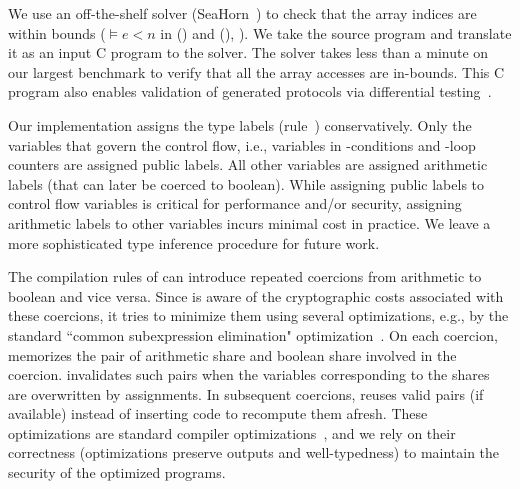 We use an off-the-shelf solver
(SeaHorn~\cite{seahorn}) to check that the array indices
are within bounds ($\models e < n$
in ({}) and ({}),
). We take the \tool source program and
translate it as an input C program to the solver. The solver takes less
than a minute on our largest benchmark to verify that all the array
accesses are in-bounds. This C program also enables
validation of \tool generated protocols via differential testing~\cite{mckeeman,frigate}.

Our implementation assigns the type labels (rule~{})
conservatively. Only the variables that govern the control flow, i.e.,
variables in -conditions and -loop counters are
assigned public labels.
All other variables are assigned arithmetic labels (that can later be
coerced to boolean). While assigning public labels to control
flow variables is critical for
performance and/or security, assigning arithmetic labels to other
variables incurs minimal cost in practice.
We leave a more sophisticated type inference procedure for future work.

The compilation rules of  can introduce
repeated coercions from arithmetic to
boolean and vice versa.
Since \tool is aware of the cryptographic costs associated with these coercions,
it tries to minimize them using several optimizations, e.g., by
the standard ``common subexpression elimination"
optimization~\cite{dragonbook}.
On each coercion, \tool memorizes the pair of arithmetic
share and boolean share involved in the coercion. 
\tool invalidates such pairs when the variables corresponding to the
shares are overwritten by assignments. 
In subsequent coercions, \tool  reuses valid pairs (if available)
instead of inserting code to recompute them afresh.
These optimizations are standard compiler
optimizations~\cite{dragonbook}, and we rely on their correctness
(optimizations preserve outputs and well-typedness) to
maintain the security of the optimized programs.

